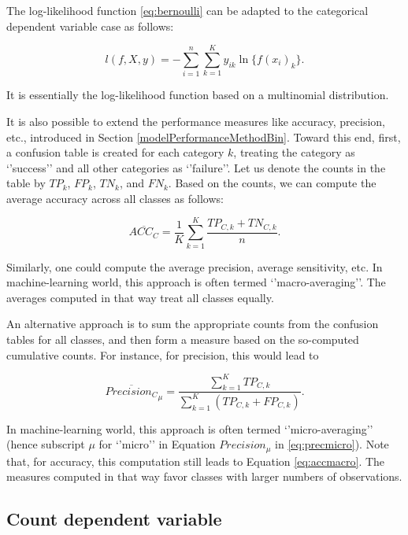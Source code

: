 \documentclass[]{krantz}
\begin{document}
The log-likelihood function \eqref{eq:bernoulli} can be adapted to the categorical dependent variable case as follows:

\begin{equation}
l(f, X ,y) =  -\sum_{i=1}^{n}\sum_{k=1}^{K} y_{ik} \ln\{f(x_i)_k\}.
\label{eq:multinom}
\end{equation}

It is essentially the log-likelihood function based on a multinomial distribution.

It is also possible to extend the performance measures like accuracy, precision, etc., introduced in Section \ref{modelPerformanceMethodBin}. Toward this end, first, a confusion table is created for each category \(k\), treating the category as `'success'' and all other categories as `'failure''. Let us denote the counts in the table by \(TP_k\), \(FP_k\), \(TN_k\), and \(FN_k\). Based on the counts, we can compute the average accuracy across all classes as follows:

\begin{equation}
\overline{ACC_C} = \frac{1}{K}\sum_{k=1}^K\frac{TP_{C,k}+TN_{C,k}}{n}.
\label{eq:accmacro}
\end{equation}

Similarly, one could compute the average precision, average sensitivity, etc. In machine-learning world, this approach is often termed `'macro-averaging''. The averages computed in that way treat all classes equally.

An alternative approach is to sum the appropriate counts from the confusion tables for all classes, and then form a measure based on the so-computed cumulative counts. For instance, for precision, this would lead to

\begin{equation}
\overline{Precision_C}_{\mu} = \frac{\sum_{k=1}^K TP_{C,k}}{\sum_{k=1}^K (TP_{C,k}+FP_{C,k})}.
\label{eq:precmicro}
\end{equation}

In machine-learning world, this approach is often termed `'micro-averaging'' (hence subscript \(\mu\) for `'micro'' in Equation \(Precision_{\mu}\) in \eqref{eq:precmicro}). Note that, for accuracy, this computation still leads to Equation \eqref{eq:accmacro}. The measures computed in that way favor classes with larger numbers of observations.

\hypertarget{modelPerformanceMethodCount}{%
\subsection{Count dependent variable}\label{modelPerformanceMethodCount}}
\end{document}
